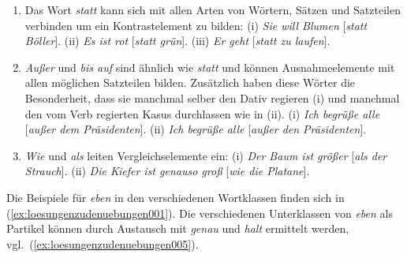 \label{sol:wortklassen03}

\begin{enumerate}
  \item Das Wort \textit{statt} kann sich mit allen Arten von Wörtern, Sätzen und Satzteilen verbinden um ein Kontrastelement zu bilden:
    (i) \textit{Sie will Blumen} [\textit{statt Böller}].
    (ii) \textit{Es ist rot} [\textit{statt grün}].
    (iii) \textit{Er geht} [\textit{statt zu laufen}]. 
  \item \textit{Außer} und \textit{bis auf} sind ähnlich wie \textit{statt} und können Ausnahmeelemente mit allen möglichen Satzteilen bilden.
    Zusätzlich haben diese Wörter die Besonderheit, dass sie manchmal selber den Dativ regieren (i) und manchmal den vom Verb regierten Kasus durchlassen wie in (ii).
    (i) \textit{Ich begrüße alle} [\textit{außer dem Präsidenten}].
    (ii) \textit{Ich begrüße alle} [\textit{außer den Präsidenten}].
  \item \textit{Wie} und \textit{als} leiten Vergleichselemente ein:
    (i) \textit{Der Baum ist größer} [\textit{als der Strauch}].
    (ii) \textit{Die Kiefer ist genauso groß} [\textit{wie die Platane}].
\end{enumerate}

\label{sol:wortklassen04}

Die Beispiele für \textit{eben} in den verschiedenen Wortklassen finden sich in (\ref{ex:loesungenzudenuebungen001}).
Die verschiedenen Unterklassen von \textit{eben} als Partikel können durch Austausch mit \textit{genau} und \textit{halt} ermittelt werden, vgl.\ (\ref{ex:loesungenzudenuebungen005}).

\begin{exe}
  \ex \label{ex:loesungenzudenuebungen001}
  \begin{xlist}
  \end{xlist}
  \ex \label{ex:loesungenzudenuebungen005}
  \begin{xlist}
  \end{xlist}
\end{exe}


